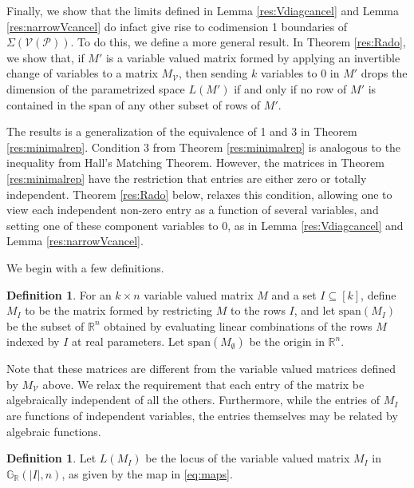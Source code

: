 \documentclass[11pt]{article}
\newcommand{\R}{\mathbb{R}}
\newcommand{\Grall}{\mathbb{G}_{\R}}
\newcommand{\cP}{\mathcal{P}}
\newcommand{\cV}{\mathcal{V}}
\newcommand{\VP}{\cV(\cP)}
\theoremstyle{remark}
\theoremstyle{definition}
\newtheorem{dfn}[thm]{Definition}
\begin{document}
\begin{appendices}

Finally, we show that the limits defined in Lemma \ref{res:Vdiagcancel} and Lemma \ref{res:narrowVcancel} do infact give rise to codimension 1 boundaries of $\Sigma(\VP)$. To do this, we define a more general result. In Theorem \ref{res:Rado}, we show that, if $M'$ is a variable valued matrix formed by applying an invertible change of variables to a matrix $M_\cV$, then sending $k$ variables to $0$ in $M'$ drops the dimension of the parametrized space $L(M')$ if and only if no row of $M'$ is contained in the span of any other subset of rows of $M'$.

The results is a generalization of the equivalence of 1 and 3 in Theorem \ref{res:minimalrep}. Condition 3 from Theorem \ref{res:minimalrep} is analogous to the inequality from Hall's Matching Theorem. However, 
the matrices in Theorem \ref{res:minimalrep} have the restriction that entries are either zero or totally independent. Theorem \ref{res:Rado} below, relaxes this condition, allowing one to view each independent non-zero entry as a function of several variables, and setting one of these component variables to $0$, as in Lemma \ref{res:Vdiagcancel} and Lemma \ref{res:narrowVcancel}. 

We begin with a few definitions. 

\begin{dfn}
For an $k \times n$ variable valued matrix $M$ and a set $I \subseteq [k]$, define $M_I$ to be the matrix formed by restricting $M$ to the rows $I$, and let $\mathrm{span}(M_I)$ be the subset of $\mathbb{R}^n$ obtained by evaluating linear combinations of the rows $M$ indexed by $I$ at real parameters. Let $\mathrm{span}(M_{\emptyset})$ be the origin in $\mathbb{R}^n$.
\end{dfn}

Note that these matrices are different from the variable valued matrices defined by $M_{\cV}$ above. We relax the requirement that each entry of the matrix be algebraically independent of all the others. Furthermore, while the entries of $M_I$ are functions of independent variables, the entries themselves may be related by algebraic functions.

\begin{dfn}
Let $L(M_I)$ be the locus of the variable valued matrix $M_I$ in $\Grall(|I|, n)$, as given by the map in \eqref{eq:maps}.
\end{dfn}


\end{appendices}
\end{document}
